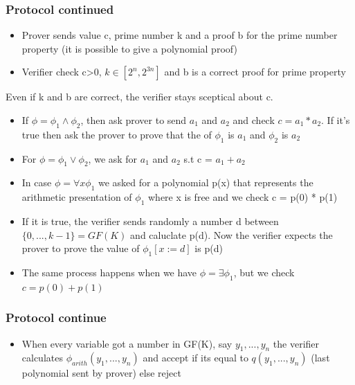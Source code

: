 \documentclass[hyperref={pdfpagelabels=false},t,10pt]{beamer}
\begin{document}
\begin{frame}
  \frametitle{Protocol continued}
  \begin{itemize}
    \item Prover sends value c, prime number k and a proof b for the prime number property (it is possible to give a polynomial proof) \pause
    \item Verifier check c>0, $k \in [2^n, 2^{3n}]$ and b is a correct proof for prime property 
  \end{itemize}
  Even if k and b are correct, the verifier stays sceptical about c. \pause

  \begin{itemize}
    \item If $\phi = \phi_1 \land \phi_2 $, then ask prover to send $a_1$ and $a_2$ and check $c = a_1 * a_2$. If it's true then ask the prover to prove that the of $\phi_1$ is $a_1$ and $\phi_2$ is $a_2$
    \item For $\phi = \phi_1 \lor \phi_2$, we ask for $a_1$ and $a_2$ s.t c = $a_1 + a_2$ \pause
    \item In case $\phi = \forall x \phi_1$ we asked for a polynomial p(x) that represents the arithmetic presentation of $\phi_1$ where x is free and we check c = p(0) * p(1)
    \item If it is true, the verifier sends randomly a number d between $\{0,..., k-1\} = GF(K)$ and caluclate p(d). Now the verifier expects the prover to prove the value of $\phi_1[x := d]$ is p(d)
    \item The same process happens when we have $\phi = \exists \phi_1$, but we check $c = p(0) + p(1)$
  \end{itemize}
  
\end{frame}

\begin{frame}
\frametitle{Protocol continue}
\begin{itemize}
  \item When every variable got a number in GF(K), say $y_1, ..., y_n$ the verifier calculates $\phi_{arith}(y_1,...,y_n)$ and accept if its equal to $q(y_1,...,y_n)$ (last polynomial sent by prover) else reject
\end{itemize}
\end{frame}
\end{document}
